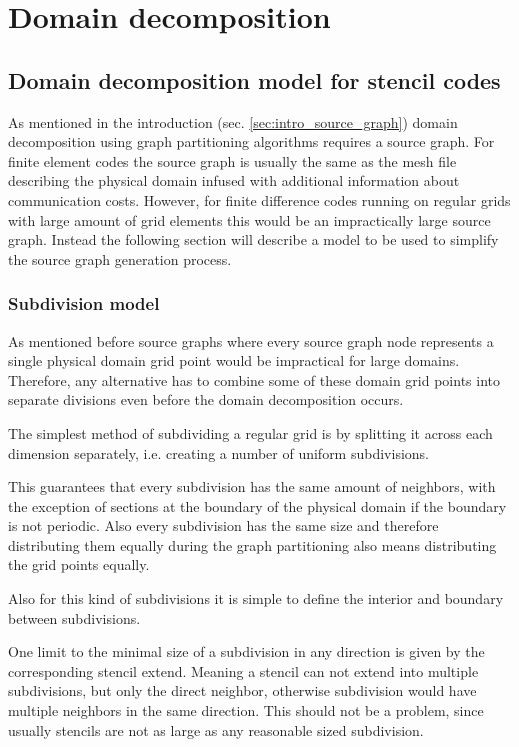 \section{Domain decomposition}
\subsection{Domain decomposition model for stencil codes}
As mentioned in the introduction (sec. \ref{sec:intro_source_graph}) domain decomposition using graph partitioning algorithms requires a source graph.
For finite element codes the source graph is usually the same as the mesh file describing the physical domain infused with additional information about communication costs.
However, for finite difference codes running on regular grids with large amount of grid elements this would be an impractically large source graph.
Instead the following section will describe a model to be used to simplify the source graph generation process.

\subsubsection{Subdivision model}
As mentioned before source graphs where every source graph node represents a single physical domain grid point would be impractical for large domains.
Therefore, any alternative has to combine some of these domain grid points into separate divisions even before the domain decomposition occurs.

The simplest method of subdividing a regular grid is by splitting it across each dimension separately, i.e. creating a number of uniform subdivisions.

This guarantees that every subdivision has the same amount of neighbors, with the exception of sections at the boundary of the physical domain if the boundary is not periodic.
Also every subdivision has the same size and therefore distributing them equally during the graph partitioning also means distributing the grid points equally.

Also for this kind of subdivisions it is simple to define the interior and boundary between subdivisions.

One limit to the minimal size of a subdivision in any direction is given by the corresponding stencil extend.
Meaning a stencil can not extend into multiple subdivisions, but only the direct neighbor, otherwise subdivision would have multiple neighbors in the same direction.
This should not be a problem, since usually stencils are not as large as any reasonable sized subdivision.

